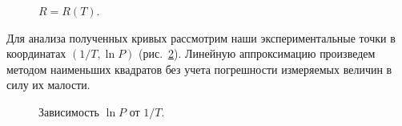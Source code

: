 \documentclass[a4paper,12pt]{article} %
\begin{document}
\begin{figure}[H]
	\caption{$R = R(T)$.}
	\label{ris:Graph_1}
\end{figure}
	
		
\newpage
	Для анализа полученных кривых рассмотрим наши экспериментальные точки в координатах $(1/T, \ln P)$ (рис.~\ref{ris:Graph_2}). Линейную аппроксимацию произведем методом наименьших квадратов без учета погрешности измеряемых величин в силу их малости.


\begin{figure}[H]
	\caption{Зависимость $\ln P$ от $1/T$.}
	\label{ris:Graph_2}
\end{figure}
\end{document}
